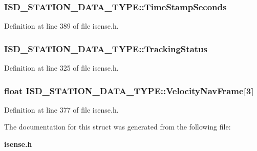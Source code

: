 \subsubsection[{\-Time\-Stamp\-Seconds}]{ {\bf \-I\-S\-D\-\_\-\-S\-T\-A\-T\-I\-O\-N\-\_\-\-D\-A\-T\-A\-\_\-\-T\-Y\-P\-E\-::\-Time\-Stamp\-Seconds}}\label{structISD__STATION__DATA__TYPE_abdc4aae1ca89885346167ee79a7ee747}


\-Definition at line 389 of file isense.\-h.

\subsubsection[{\-Tracking\-Status}]{ {\bf \-I\-S\-D\-\_\-\-S\-T\-A\-T\-I\-O\-N\-\_\-\-D\-A\-T\-A\-\_\-\-T\-Y\-P\-E\-::\-Tracking\-Status}}\label{structISD__STATION__DATA__TYPE_a6ea749840cea3bf80151f658e4a2a4de}


\-Definition at line 325 of file isense.\-h.

\subsubsection[{\-Velocity\-Nav\-Frame}]{\setlength{\rightskip}{0pt plus 5cm}float {\bf \-I\-S\-D\-\_\-\-S\-T\-A\-T\-I\-O\-N\-\_\-\-D\-A\-T\-A\-\_\-\-T\-Y\-P\-E\-::\-Velocity\-Nav\-Frame}[3]}\label{structISD__STATION__DATA__TYPE_a0ff2dce179bbeddcc9db14859cfcddd7}


\-Definition at line 377 of file isense.\-h.



\-The documentation for this struct was generated from the following file\-:\begin{DoxyCompactItemize}
\item 
{\bf isense.\-h}\end{DoxyCompactItemize}
